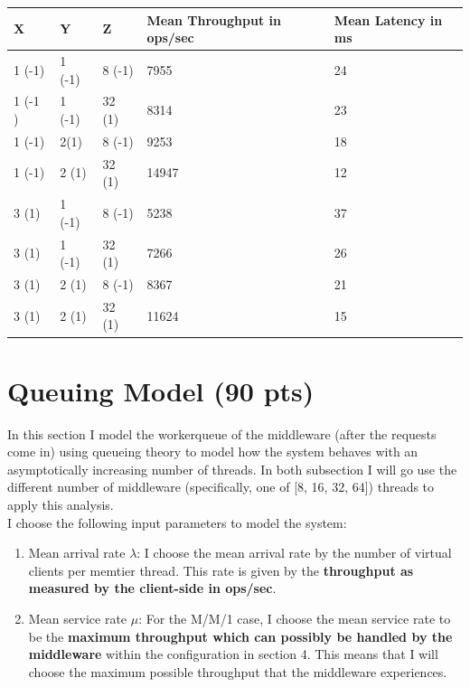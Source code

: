 \documentclass[11pt,a4paper]{article}
\begin{document}
\begin{center}
    \begin{tabular}{ | l | l | l | l | l | }
    \hline
    X & Y & Z & Mean Throughput in ops/sec & Mean Latency in ms\\ \hline
    1 (-1) & 1 (-1) & 8 (-1) & 7955 & 24 \\ \hline
    1 (-1 )& 1 (-1) & 32 (1) & 8314 & 23 \\ \hline
    1 (-1) & 2(1)  & 8 (-1) & 9253 & 18 \\ \hline
   	1 (-1) & 2 (1) & 32 (1) & 14947 & 12 \\ \hline
    3 (1) & 1 (-1) & 8 (-1) & 5238 & 37 \\ \hline
    3 (1) & 1 (-1) & 32 (1) & 7266 & 26 \\ \hline
    3 (1) & 2 (1) & 8 (-1) & 8367 & 21 \\ \hline
    3 (1) & 2 (1) & 32 (1) & 11624 & 15 \\
    \hline
    \end{tabular}
\end{center}


\section{Queuing Model (90 pts)}

In this section I model the workerqueue of the middleware (after the requests come in) using queueing theory to model how the system behaves with an asymptotically increasing number of threads.
In both subsection I will go use the different number of middleware (specifically, one of [8, 16, 32, 64]) threads to apply this analysis. \\

I choose the following input parameters to model the system:

\begin{enumerate}
\item Mean arrival rate $\lambda$: I choose the mean arrival rate by the number of virtual clients per memtier thread.
This rate is given by the \textbf{throughput as measured by the client-side in ops/sec}.
\item Mean service rate $\mu$: For the M/M/1 case, I choose the mean service rate to be the \textbf{maximum throughput which can possibly be handled by the middleware} within the configuration in section 4.
This means that I will choose the maximum possible throughput that the middleware experiences.
\end{enumerate}
\end{document}
